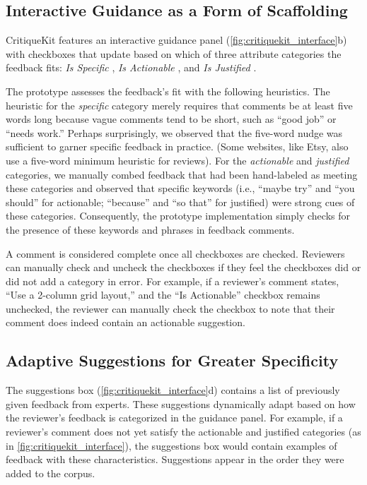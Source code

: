 \subsection{Interactive Guidance as a Form of Scaffolding}
CritiqueKit features an interactive guidance panel (\autoref{fig:critiquekit_interface}b) with checkboxes that update based on which of three attribute categories the feedback fits: \textit{Is Specific} \cite{Krause2017, Sadler1989, Sommers1982, Yuan2016}, \textit{Is Actionable} \cite{Dow2012, Gibbs, Kulkarni2015, Luther2015, Sadler1989, Tseng2007}, and \textit{Is Justified} \cite{Gielen2010, Krause2017, Narciss2006, Yuan2016}. 

The prototype assesses the feedback's fit with the following heuristics. The heuristic for the \textit{specific} category merely requires that comments be at least five words long because vague comments tend to be short, such as ``good job'' or ``needs work.'' Perhaps surprisingly, we observed that the five-word nudge was sufficient to garner specific feedback in practice. (Some websites, like Etsy, also use a five-word minimum heuristic for reviews). For the \textit{actionable} and \textit{justified} categories, we manually combed feedback that had been hand-labeled as meeting these categories and observed that specific keywords (i.e., ``maybe try'' and ``you should'' for actionable; ``because'' and ``so that'' for justified) were strong cues of these categories. Consequently, the prototype implementation simply checks for the presence of these keywords and phrases in feedback comments. 

A comment is considered complete once all checkboxes are checked. Reviewers can manually check and uncheck the checkboxes if they feel the checkboxes did or did not add a category in error. For example, if a reviewer's comment states, ``Use a 2-column grid layout,'' and the ``Is Actionable'' checkbox remains unchecked, the reviewer can manually check the checkbox to note that their comment does indeed contain an actionable suggestion. 

\subsection{Adaptive Suggestions for Greater Specificity}
The suggestions box (\autoref{fig:critiquekit_interface}d) contains a list of previously given feedback from experts. These suggestions dynamically adapt based on how the reviewer's feedback is categorized in the guidance panel. For example, if a reviewer's comment does not yet satisfy the actionable and justified categories (as in \autoref{fig:critiquekit_interface}), the suggestions box would contain examples of feedback with these characteristics. Suggestions appear in the order they were added to the corpus.

